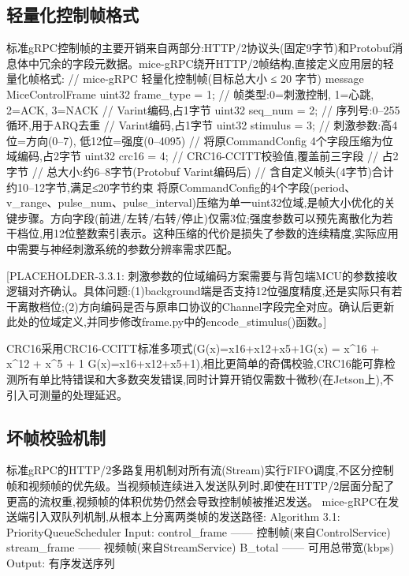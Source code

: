 \subsection{轻量化控制帧格式}

标准gRPC控制帧的主要开销来自两部分:HTTP/2协议头(固定9字节)和Protobuf消息体中冗余的字段元数据。mice-gRPC绕开HTTP/2帧结构,直接定义应用层的轻量化帧格式:
// mice-gRPC 轻量化控制帧(目标总大小 ≤ 20 字节)
message MiceControlFrame {
  uint32 frame_type = 1;  // 帧类型:0=刺激控制, 1=心跳, 2=ACK, 3=NACK
                          // Varint编码,占1字节
  uint32 seq_num    = 2;  // 序列号:0–255循环,用于ARQ去重
                          // Varint编码,占1字节
  uint32 stimulus   = 3;  // 刺激参数:高4位=方向(0–7), 低12位=强度(0–4095)
                          // 将原CommandConfig 4个字段压缩为位域编码,占2字节
  uint32 crc16      = 4;  // CRC16-CCITT校验值,覆盖前三字段
                          // 占2字节
}
// 总大小:约6–8字节(Protobuf Varint编码后)
// 含自定义帧头(4字节)合计约10–12字节,满足≤20字节约束
将原CommandConfig的4个字段(period、v_range、pulse_num、pulse_interval)压缩为单一uint32位域,是帧大小优化的关键步骤。方向字段(前进/左转/右转/停止)仅需3位;强度参数可以预先离散化为若干档位,用12位整数索引表示。这种压缩的代价是损失了参数的连续精度,实际应用中需要与神经刺激系统的参数分辨率需求匹配。

[PLACEHOLDER-3.3.1: 刺激参数的位域编码方案需要与背包端MCU的参数接收逻辑对齐确认。具体问题:(1)background端是否支持12位强度精度,还是实际只有若干离散档位;(2)方向编码是否与原串口协议的Channel字段完全对应。确认后更新此处的位域定义,并同步修改frame.py中的encode_stimulus()函数。]

CRC16采用CRC16-CCITT标准多项式(G(x)=x16+x12+x5+1G(x) = x^{16} + x^{12} + x^5 + 1
G(x)=x16+x12+x5+1),相比更简单的奇偶校验,CRC16能可靠检测所有单比特错误和大多数突发错误,同时计算开销仅需数十微秒(在Jetson上),不引入可测量的处理延迟。

\subsection{坏帧校验机制}

标准gRPC的HTTP/2多路复用机制对所有流(Stream)实行FIFO调度,不区分控制帧和视频帧的优先级。当视频帧连续进入发送队列时,即使在HTTP/2层面分配了更高的流权重,视频帧的体积优势仍然会导致控制帧被推迟发送。
mice-gRPC在发送端引入双队列机制,从根本上分离两类帧的发送路径:
Algorithm 3.1: PriorityQueueScheduler
Input:  control_frame  —— 控制帧(来自ControlService)
        stream_frame   —— 视频帧(来自StreamService)
        B_total        —— 可用总带宽(kbps)
Output: 有序发送序列

